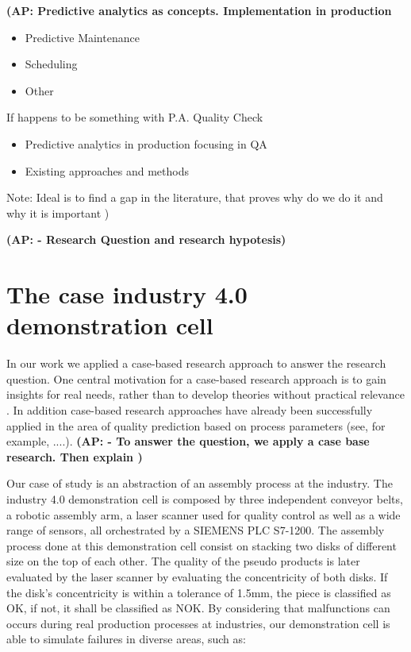 \documentclass[5p,times,procedia]{elsarticle}
\newcommand{\AP}[1]{{\color{blue} {\bf (AP: #1)}}}
\begin{document}
\AP{
Predictive analytics as concepts. Implementation in production
\begin{itemize}
       \item Predictive Maintenance
       \item Scheduling
       \item Other
\end{itemize}       
If happens to be something with P.A. Quality Check
\begin{itemize}
       \item	Predictive analytics in production focusing in QA
       \item	Existing approaches and methods
\end{itemize}      
Note: Ideal is to find a gap in the literature, that proves why do we do it and why it is important
}

\AP{ - Research Question and research hypotesis}

\section{The case industry 4.0 demonstration cell} %

In our work we applied a case-based research approach \cite{yin2017case} to answer the research question. 
One central motivation for a case-based research approach is to gain insights for real needs, rather than to develop theories without practical relevance \cite{cutcheon1993case}. %
In addition case-based research approaches have already been successfully applied in the area of quality prediction based on process parameters (see, for example, ....). %
\AP{ 
       - To answer the question, we apply a case base research. Then explain 
}

Our case of study is an abstraction of an assembly process at the industry. The industry 4.0 demonstration cell is composed by three independent conveyor belts, a robotic assembly arm, a laser scanner used for quality control as well as a wide range of sensors, all orchestrated by a SIEMENS PLC S7-1200. 
The assembly process done at this demonstration cell consist on stacking two disks of different size on the top of each other. The quality of the pseudo products is later evaluated by the laser scanner by evaluating the concentricity of both disks. If the disk's concentricity is within a tolerance of 1.5mm, the piece is classified as OK, if not, it shall be classified as NOK.
By considering that malfunctions can occurs during real production processes at industries, our demonstration cell is able to simulate failures in diverse areas, such as:
\end{document}
